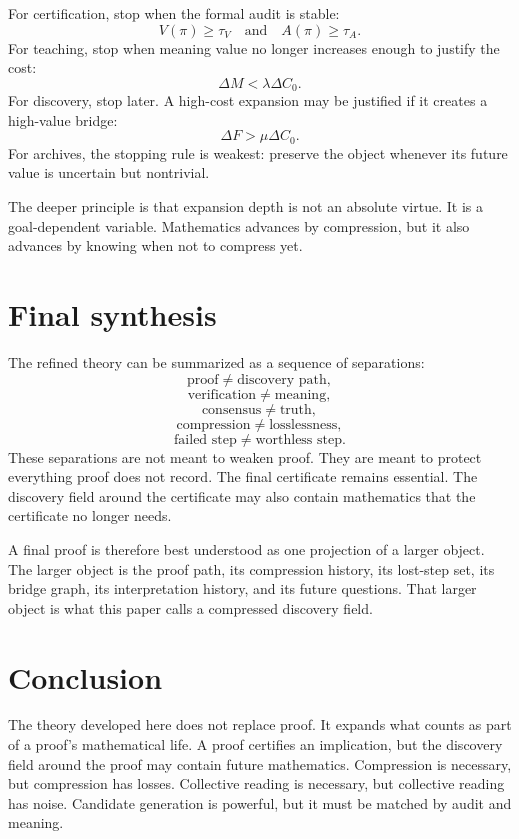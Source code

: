 \documentclass[11pt,oneside]{book}
\theoremstyle{remark}
\begin{document}
For certification, stop when the formal audit is stable:
\[
        V(\pi)\ge \tau_V
        \quad\text{and}\quad
        A(\pi)\ge \tau_A.
\]
For teaching, stop when meaning value no longer increases enough to justify the cost:
\[
        \Delta M < \lambda\Delta C_0.
\]
For discovery, stop later.  A high-cost expansion may be justified if it creates a high-value bridge:
\[
        \Delta F > \mu\Delta C_0.
\]
For archives, the stopping rule is weakest: preserve the object whenever its future value is uncertain but nontrivial.

The deeper principle is that expansion depth is not an absolute virtue.  It is a goal-dependent variable.  Mathematics advances by compression, but it also advances by knowing when not to compress yet.

\section{Final synthesis}

The refined theory can be summarized as a sequence of separations:
\[
        \text{proof}\ne\text{discovery path},
\]
\[
        \text{verification}\ne\text{meaning},
\]
\[
        \text{consensus}\ne\text{truth},
\]
\[
        \text{compression}\ne\text{losslessness},
\]
\[
        \text{failed step}\ne\text{worthless step}.
\]
These separations are not meant to weaken proof.  They are meant to protect everything proof does not record.  The final certificate remains essential.  The discovery field around the certificate may also contain mathematics that the certificate no longer needs.

A final proof is therefore best understood as one projection of a larger object.  The larger object is the proof path, its compression history, its lost-step set, its bridge graph, its interpretation history, and its future questions.  That larger object is what this paper calls a compressed discovery field.

\section{Conclusion}

The theory developed here does not replace proof.  It expands what counts as part of a proof's mathematical life.  A proof certifies an implication, but the discovery field around the proof may contain future mathematics.  Compression is necessary, but compression has losses.  Collective reading is necessary, but collective reading has noise.  Candidate generation is powerful, but it must be matched by audit and meaning.
\end{document}
